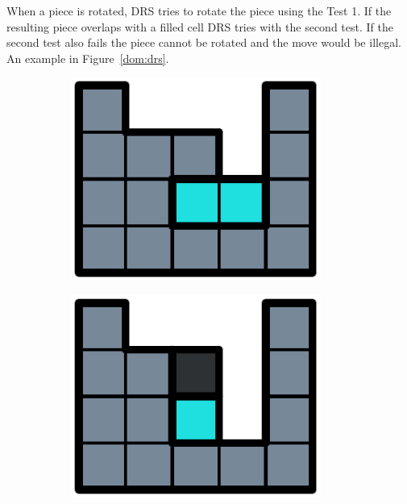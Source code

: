 When a piece is rotated, DRS tries to rotate the piece using the Test 1. If the resulting piece overlaps with a filled cell DRS tries with the second test. If the second test also fails the piece cannot be rotated and the move would be illegal. An example in Figure~\ref{dom:drs}.

\begin{figure}[ht]
  \centering
  \begin{subfigure}[b]{0.2\textwidth}
    \centering
    \includegraphics[width=0.9\textwidth]{pictures/dominoes/drs-1.pdf}
    \caption{}
  \end{subfigure}
  \begin{subfigure}[b]{0.2\textwidth}
    \centering
    \includegraphics[width=0.9\textwidth]{pictures/dominoes/drs-2.pdf}

\end{subfigure}
\end{figure}
